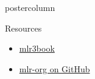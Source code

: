 \documentclass{beamer}
\begin{document}
\begin{frame}[fragile]{}
\begin{columns}
\begin{column}{.31\textwidth}
\begin{beamercolorbox}[center]{postercolumn}
\begin{minipage}{.98\textwidth}
{					\begin{myblock}{Resources}
						\begin{itemize}
							\item \href{https://mlr3book.mlr-org.com/index.html}{mlr3book}
							\item \href{https://github.com/mlr-org}{mlr-org on GitHub} 
						\end{itemize}
					\end{myblock}\vfill
				}
			\end{minipage}
		\end{beamercolorbox}
	\end{column}
\end{columns}
\end{frame}
\end{document}
